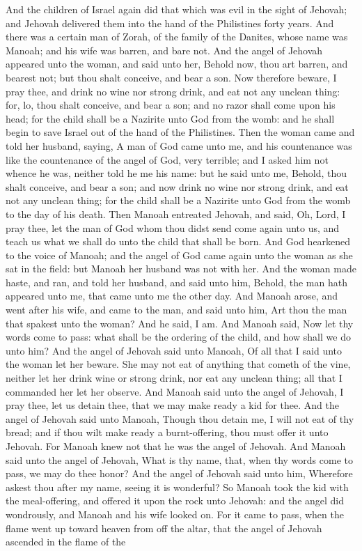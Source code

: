 And the children of Israel again did that which was evil in the sight of Jehovah; and Jehovah delivered them into the hand of the Philistines forty years.  And there was a certain man of Zorah, of the family of the Danites, whose name was Manoah; and his wife was barren, and bare not. And the angel of Jehovah appeared unto the woman, and said unto her, Behold now, thou art barren, and bearest not; but thou shalt conceive, and bear a son. Now therefore beware, I pray thee, and drink no wine nor strong drink, and eat not any unclean thing: for, lo, thou shalt conceive, and bear a son; and no razor shall come upon his head; for the child shall be a Nazirite unto God from the womb: and he shall begin to save Israel out of the hand of the Philistines. Then the woman came and told her husband, saying, A man of God came unto me, and his countenance was like the countenance of the angel of God, very terrible; and I asked him not whence he was, neither told he me his name: but he said unto me, Behold, thou shalt conceive, and bear a son; and now drink no wine nor strong drink, and eat not any unclean thing; for the child shall be a Nazirite unto God from the womb to the day of his death.  Then Manoah entreated Jehovah, and said, Oh, Lord, I pray thee, let the man of God whom thou didst send come again unto us, and teach us what we shall do unto the child that shall be born. And God hearkened to the voice of Manoah; and the angel of God came again unto the woman as she sat in the field: but Manoah her husband was not with her. And the woman made haste, and ran, and told her husband, and said unto him, Behold, the man hath appeared unto me, that came unto me the other day. And Manoah arose, and went after his wife, and came to the man, and said unto him, Art thou the man that spakest unto the woman? And he said, I am. And Manoah said, Now let thy words come to pass: what shall be the ordering of the child, and how shall we do unto him? And the angel of Jehovah said unto Manoah, Of all that I said unto the woman let her beware. She may not eat of anything that cometh of the vine, neither let her drink wine or strong drink, nor eat any unclean thing; all that I commanded her let her observe.  And Manoah said unto the angel of Jehovah, I pray thee, let us detain thee, that we may make ready a kid for thee. And the angel of Jehovah said unto Manoah, Though thou detain me, I will not eat of thy bread; and if thou wilt make ready a burnt-offering, thou must offer it unto Jehovah. For Manoah knew not that he was the angel of Jehovah. And Manoah said unto the angel of Jehovah, What is thy name, that, when thy words come to pass, we may do thee honor? And the angel of Jehovah said unto him, Wherefore askest thou after my name, seeing it is wonderful? So Manoah took the kid with the meal-offering, and offered it upon the rock unto Jehovah: and the angel did wondrously, and Manoah and his wife looked on. For it came to pass, when the flame went up toward heaven from off the altar, that the angel of Jehovah ascended in the flame of the 